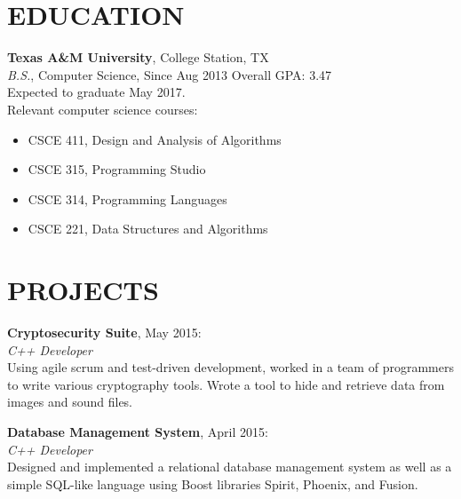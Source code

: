\documentclass[margin]{res}
\begin{document}
\begin{resume}

\section{EDUCATION}
\textbf{Texas A\&M University}, College Station, TX\\
{\sl B.S.}, Computer Science, Since Aug 2013 \hfill Overall GPA: 3.47\\
Expected to graduate May 2017.\\
Relevant computer science courses:
  \begin{itemize}
    \item CSCE 411, Design and Analysis of Algorithms
    \item CSCE 315, Programming Studio
    \item CSCE 314, Programming Languages
    \item CSCE 221, Data Structures and Algorithms
  \end{itemize}


\section{PROJECTS}
\par
\textbf{Cryptosecurity Suite}, May 2015:\\
{\sl C++ Developer}\\
Using agile scrum and test-driven development, worked in a team of programmers to
write various cryptography tools. Wrote a tool to hide and retrieve data from images
and sound files.

\par
\textbf{Database Management System}, April 2015:\\
{\sl C++ Developer}\\
Designed and implemented a relational database management system as well as a simple
SQL-like language using Boost libraries Spirit, Phoenix, and Fusion.


\end{resume}
\end{document}
